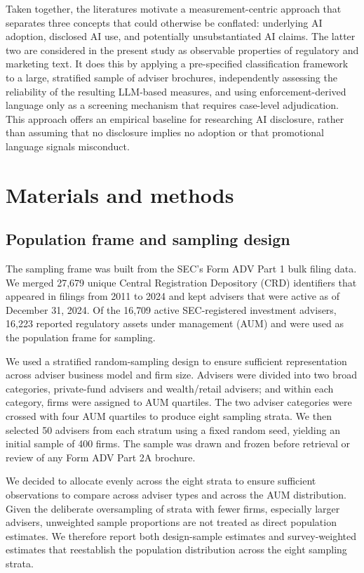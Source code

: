 \documentclass[utf8]{FrontiersinHarvard}
\begin{document}
Taken together, the literatures motivate a measurement-centric approach that separates three concepts that could otherwise be conflated: underlying AI adoption, disclosed AI use, and potentially unsubstantiated AI claims. The latter two are considered in the present study as observable properties of regulatory and marketing text. It does this by applying a pre-specified classification framework to a large, stratified sample of adviser brochures, independently assessing the reliability of the resulting LLM-based measures, and using enforcement-derived language only as a screening mechanism that requires case-level adjudication. This approach offers an empirical baseline for researching AI disclosure, rather than assuming that no disclosure implies no adoption or that promotional language signals misconduct.

\section{Materials and methods}

\subsection{Population frame and sampling design}

The sampling frame was built from the SEC's Form ADV Part 1 bulk filing data. We merged 27{,}679 unique Central Registration Depository (CRD) identifiers that appeared in filings from 2011 to 2024 and kept advisers that were active as of December 31, 2024. Of the 16{,}709 active SEC-registered investment advisers, 16{,}223 reported regulatory assets under management (AUM) and were used as the population frame for sampling.

We used a stratified random-sampling design to ensure sufficient representation across adviser business model and firm size. Advisers were divided into two broad categories, private-fund advisers and wealth/retail advisers; and within each category, firms were assigned to AUM quartiles. The two adviser categories were crossed with four AUM quartiles to produce eight sampling strata. We then selected 50 advisers from each stratum using a fixed random seed, yielding an initial sample of 400 firms. The sample was drawn and frozen before retrieval or review of any Form ADV Part 2A brochure.

We decided to allocate evenly across the eight strata to ensure sufficient observations to compare across adviser types and across the AUM distribution. Given the deliberate oversampling of strata with fewer firms, especially larger advisers, unweighted sample proportions are not treated as direct population estimates. We therefore report both design-sample estimates and survey-weighted estimates that reestablish the population distribution across the eight sampling strata.
\end{document}

